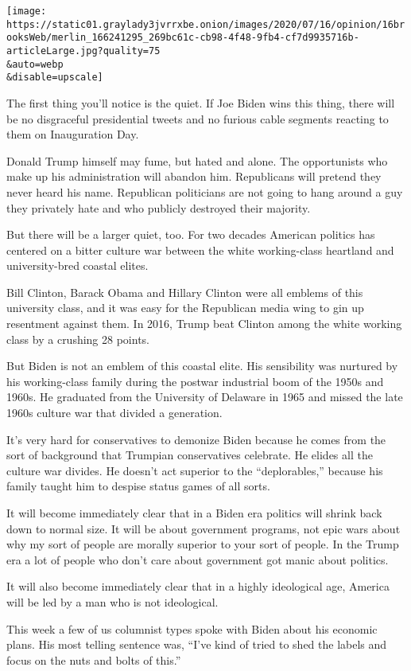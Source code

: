 \texttt{[image: https://static01.graylady3jvrrxbe.onion/images/2020/07/16/opinion/16brooksWeb/merlin\_166241295\_269bc61c-cb98-4f48-9fb4-cf7d9935716b-articleLarge.jpg?quality=75\\\&auto=webp\\\&disable=upscale]}

The first thing you'll notice is the quiet. If Joe Biden wins this
thing, there will be no disgraceful presidential tweets and no furious
cable segments reacting to them on Inauguration Day.

Donald Trump himself may fume, but hated and alone. The opportunists who
make up his administration will abandon him. Republicans will pretend
they never heard his name. Republican politicians are not going to hang
around a guy they privately hate and who publicly destroyed their
majority.

But there will be a larger quiet, too. For two decades American politics
has centered on a bitter culture war between the white working-class
heartland and university-bred coastal elites.

Bill Clinton, Barack Obama and Hillary Clinton were all emblems of this
university class, and it was easy for the Republican media wing to gin
up resentment against them. In 2016, Trump beat Clinton among the white
working class by a crushing 28 points.

But Biden is not an emblem of this coastal elite. His sensibility was
nurtured by his working-class family during the postwar industrial boom
of the 1950s and 1960s. He graduated from the University of Delaware in
1965 and missed the late 1960s culture war that divided a generation.

It's very hard for conservatives to demonize Biden because he comes from
the sort of background that Trumpian conservatives celebrate. He elides
all the culture war divides. He doesn't act superior to the
``deplorables,'' because his family taught him to despise status games
of all sorts.

It will become immediately clear that in a Biden era politics will
shrink back down to normal size. It will be about government programs,
not epic wars about why my sort of people are morally superior to your
sort of people. In the Trump era a lot of people who don't care about
government got manic about politics.

It will also become immediately clear that in a highly ideological age,
America will be led by a man who is not ideological.

This week a few of us columnist types spoke with Biden about his
economic plans. His most telling sentence was, ``I've kind of tried to
shed the labels and focus on the nuts and bolts of this.''


